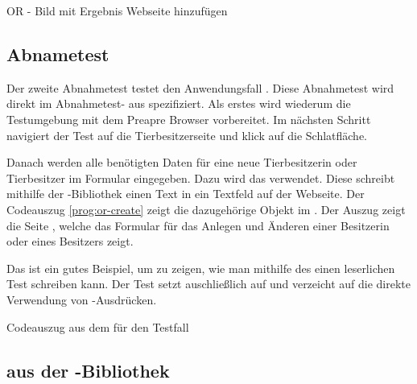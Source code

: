 \todo OR - Bild mit Ergebnis Webseite hinzufügen


\subsection{Abnametest }
\label{cha:TestenUA2}


Der zweite Abnahmetest testet den Anwendungsfall . Diese Abnahmetest wird direkt im Abnahmetest- aus spezifiziert. Als erstes wird wiederum die Testumgebung mit dem  {Preapre Browser} vorbereitet. Im nächsten Schritt navigiert der Test auf die Tierbesitzerseite und klick auf die  Schlatfläche. 


\SuperPar
Danach werden alle benötigten Daten für eine neue Tierbesitzerin oder Tierbesitzer im Formular eingegeben. Dazu wird das   verwendet. Diese  schreibt mithilfe der -Bibliothek einen Text in ein Textfeld auf der Webseite. Der Codeauszug \ref{prog:or-create} zeigt die dazugehörige Objekt im .  Der Auszug zeigt die Seite , welche das Formular für das Anlegen und Änderen einer Besitzerin oder eines Besitzers zeigt.

\SuperPar
Das   ist ein gutes Beispiel, um zu zeigen, wie man mithilfe des  einen leserlichen Test schreiben kann. Der Test setzt auschließlich auf   und verzeicht auf die direkte Verwendung von -Ausdrücken. 

\begin{program}

\caption{Codeauszug aus dem  für den Testfall }
\label{prog:or-create}
\end{program}

\clearpage

\subsection{ aus der -Bibliothek}
\label{cha:TestenSelenium}

